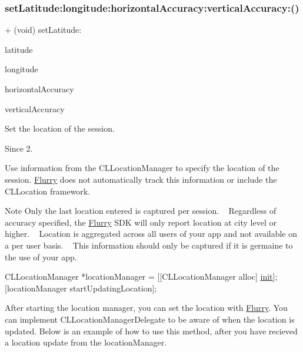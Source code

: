 \subsubsection{\texorpdfstring{set\+Latitude\+:longitude\+:horizontal\+Accuracy\+:vertical\+Accuracy\+:()}{setLatitude:longitude:horizontalAccuracy:verticalAccuracy:()}}
{\footnotesize\ttfamily + (void) set\+Latitude\+: \begin{DoxyParamCaption}\item[{(double)}]{latitude }\item[{longitude:(double)}]{longitude }\item[{horizontalAccuracy:(float)}]{horizontal\+Accuracy }\item[{verticalAccuracy:(float)}]{vertical\+Accuracy }\end{DoxyParamCaption}}



Set the location of the session. 

\begin{DoxySince}{Since}
2.
\end{DoxySince}
Use information from the C\+L\+Location\+Manager to specify the location of the session. \hyperlink{interfaceFlurry}{Flurry} does not automatically track this information or include the C\+L\+Location framework.

\begin{DoxyNote}{Note}
Only the last location entered is captured per session. ~\newline
 Regardless of accuracy specified, the \hyperlink{interfaceFlurry}{Flurry} S\+DK will only report location at city level or higher. ~\newline
 Location is aggregated across all users of your app and not available on a per user basis. ~\newline
 This information should only be captured if it is germaine to the use of your app.
\end{DoxyNote}

\begin{DoxyCode}
CLLocationManager *locationManager = [[CLLocationManager alloc] \hyperlink{namespaceDrawPrimitives_ae042e1546ce595f9b01f92bcac0be48a}{init}];
[locationManager startUpdatingLocation];
\end{DoxyCode}


After starting the location manager, you can set the location with \hyperlink{interfaceFlurry}{Flurry}. You can implement C\+L\+Location\+Manager\+Delegate to be aware of when the location is updated. Below is an example of how to use this method, after you have recieved a location update from the location\+Manager.


